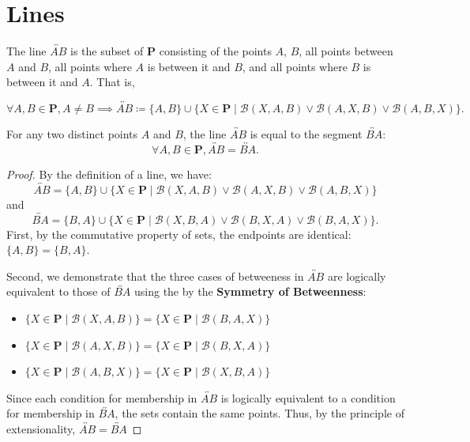 \documentclass[../../../main/main.tex]{subfiles}
\begin{document}
\section{Lines}

The line $\overleftrightarrow{AB}$ is the subset of $\mathbf{P}$ consisting of the points $A$, $B$, all points between $A$ and $B$, all points where $A$ is between it and $B$, and all points where $B$ is between it and $A$. That is,
\begin{definition}[Line]
    \[
    \forall A, B \in \mathbf{P}, A \neq B \implies \overleftrightarrow{AB} \coloneqq \{A, B\} \cup \{X \in \mathbf{P} \mid \mathcal{B}(X, A, B) \lor \mathcal{B}(A, X, B) \lor \mathcal{B}(A, B, X)\}.
    \]
\end{definition}

\begin{theorem}
    For any two distinct points $A$ and $B$, the line $\overleftrightarrow{AB}$ is equal to the segment $\overleftrightarrow{BA}$:
    \[
    \forall A, B \in \mathbf{P}, \overleftrightarrow{AB} = \overleftrightarrow{BA}.
    \]
\end{theorem}
\begin{proof}
    By the definition of a line, we have:
    \[
    \overleftrightarrow{AB} = \{A, B\} \cup \{X \in \mathbf{P} \mid \mathcal{B}(X, A, B) \lor \mathcal{B}(A, X, B) \lor \mathcal{B}(A, B, X)\}
    \]
    and
    \[
    \overleftrightarrow{BA} = \{B, A\} \cup \{X \in \mathbf{P} \mid \mathcal{B}(X, B, A) \lor \mathcal{B}(B, X, A) \lor \mathcal{B}(B, A, X)\}.
    \]
    First, by the commutative property of sets, the endpoints are identical: $\{A, B\} = \{B, A\}$.

    Second, we demonstrate that the three cases of betweeness in $\overleftrightarrow{AB}$ are logically equivalent to those of $\overleftrightarrow{BA}$ using the by the \textbf{Symmetry of Betweenness}:
    \begin{itemize}
        \item $\{X \in \mathbf{P} \mid \mathcal{B}(X, A, B)\} = \{X \in \mathbf{P} \mid \mathcal{B}(B, A, X)\}$
        \item $\{X \in \mathbf{P} \mid \mathcal{B}(A, X, B)\} = \{X \in \mathbf{P} \mid \mathcal{B}(B, X, A)\}$
        \item $\{X \in \mathbf{P} \mid \mathcal{B}(A, B, X)\} = \{X \in \mathbf{P} \mid \mathcal{B}(X, B, A)\}$
    \end{itemize}
    Since each condition for membership in $\overleftrightarrow{AB}$ is logically equivalent to a condition for membership in $\overleftrightarrow{BA}$, the sets contain the same points. Thus, by the principle of extensionality, $\overleftrightarrow{AB} = \overleftrightarrow{BA}$
\end{proof}
\end{document}
